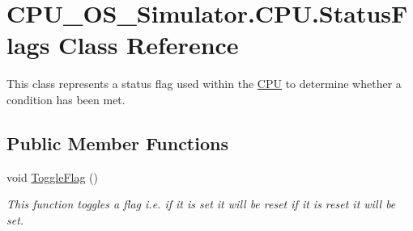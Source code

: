 \hypertarget{class_c_p_u___o_s___simulator_1_1_c_p_u_1_1_status_flags}{}\section{C\+P\+U\+\_\+\+O\+S\+\_\+\+Simulator.\+C\+P\+U.\+Status\+Flags Class Reference}
\label{class_c_p_u___o_s___simulator_1_1_c_p_u_1_1_status_flags}


This class represents a status flag used within the \hyperlink{namespace_c_p_u___o_s___simulator_1_1_c_p_u}{C\+P\+U} to determine whether a condition has been met.  


\subsection*{Public Member Functions}
\begin{DoxyCompactItemize}
\item 
void \hyperlink{class_c_p_u___o_s___simulator_1_1_c_p_u_1_1_status_flags_aca93016e4ad4e70951b071ba2ae575c1}{Toggle\+Flag} ()
\begin{DoxyCompactList}\small\item\em This function toggles a flag i.\+e. if it is set it will be reset if it is reset it will be set. \end{DoxyCompactList}\end{DoxyCompactItemize}
